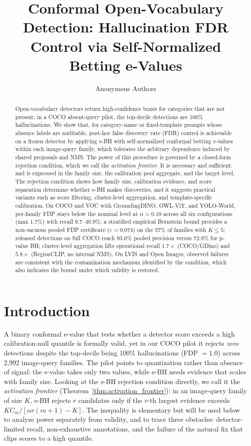 \documentclass{article}
\title{Conformal Open-Vocabulary Detection: Hallucination FDR Control via Self-Normalized Betting e-Values}
\author{Anonymous Authors}
\theoremstyle{remark}
\newcommand{\1}{\mathbf{1}}
\begin{document}
\maketitle

\begin{abstract}
Open-vocabulary detectors return high-confidence boxes for categories
that are not present: in a COCO absent-query pilot, the top-decile
detections are 100\% hallucinations. We show that, for category-name
or fixed-template prompts whose absence labels are auditable, post-hoc
false discovery rate (FDR) control is achievable on a frozen detector
by applying e-BH with self-normalized conformal betting e-values
within each image-query family, which tolerates the arbitrary
dependence induced by shared proposals and NMS. The power of this procedure is governed by a closed-form rejection
condition, which we call the \emph{activation frontier}. It is
necessary and sufficient, and is expressed in the family size, the
calibration pool aggregate, and the target level. The rejection
condition shows how family size, calibration evidence, and score
separation determine whether e-BH makes discoveries, and it
suggests practical variants such as score filtering, cluster-level
aggregation, and template-specific calibration. On COCO and
VOC with GroundingDINO, OWL-ViT, and YOLO-World, per-family FDP
stays below the nominal level at $\alpha=0.10$ across all six
configurations (max $1.7\%$) with recall $9.7$--$40.9\%$; a
stratified empirical Bernstein bound provides a non-vacuous pooled FDP
certificate ($\varepsilon\!=\!0.074$) on the 57\% of families with
$K\!\le\!5$; released detections on full COCO reach $93.6\%$ pooled
precision versus $72.9\%$ for p-value BH; cluster-level aggregation lifts
operational recall $1.7\times$ (COCO/GDino) and $5.8\times$
(RegionCLIP, no internal NMS). On LVIS and Open Images, observed
failures are consistent with the contamination mechanism identified
by the condition, which also indicates the bound under which
validity is restored.
\end{abstract}

\section{Introduction}
\label{sec:intro}

A binary conformal e-value that tests whether a detector score
exceeds a high calibration-null quantile is formally valid, yet in
our COCO pilot it rejects \emph{zero} detections despite the
top-decile being 100\% hallucinations (FDP $=1.0$) across
2{,}992 image-query families. The pilot points to quantization
rather than absence of signal: the e-value takes only two values,
while e-BH needs evidence that scales with family size. Looking at
the e-BH rejection condition directly, we call it the
\emph{activation frontier} (Theorem~\ref{thm:activation_frontier}):
in an image-query family of size $K$, e-BH rejects $r$ candidates
only if the $r$-th largest evidence exceeds
$K C_m / [\alpha r(m{+}1){-}K]$. The inequality is elementary but
will be used below to analyze power separately from validity, and
to trace three obstacles: detector-limited recall, non-exhaustive
annotations, and the failure of the natural fix that clips scores
to a high quantile.
\end{document}
